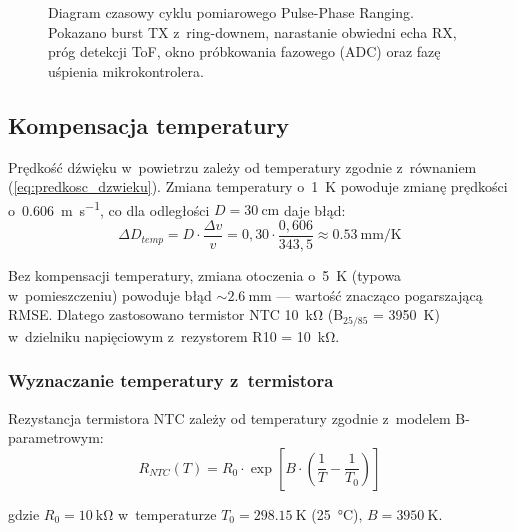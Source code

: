 \documentclass[a4paper,11pt]{article}
\begin{document}
\begin{figure}[H]
{%
    }
    \caption{Diagram czasowy cyklu pomiarowego Pulse-Phase Ranging. Pokazano burst
    TX z~ring-downem, narastanie obwiedni echa RX, próg detekcji ToF, okno
    próbkowania fazowego (ADC) oraz fazę uśpienia mikrokontrolera.}
    \label{fig:diagram_czasowy}
\end{figure}

\subsection{Kompensacja temperatury}
\label{sec:temp_komp}

Prędkość dźwięku w~powietrzu zależy od temperatury zgodnie z~równaniem
(\ref{eq:predkosc_dzwieku}). Zmiana temperatury o~\SI{1}{\kelvin} powoduje
zmianę prędkości o~\SI{0,606}{\metre\per\second}, co dla odległości
$D = \SI{30}{\centi\metre}$ daje błąd:
\begin{equation}
    \Delta D_{temp} = D \cdot \frac{\Delta v}{v} = 0{,}30 \cdot \frac{0{,}606}{343{,}5} \approx \SI{0,53}{\milli\metre\per\kelvin}
    \label{eq:blad_temp}
\end{equation}

Bez kompensacji temperatury, zmiana otoczenia o~\SI{5}{\kelvin} (typowa
w~pomieszczeniu) powoduje błąd ${\sim}\SI{2,6}{\milli\metre}$ --- wartość
znacząco pogarszającą RMSE. Dlatego zastosowano termistor NTC \SI{10}{\kilo\ohm}
(B$_{25/85}$ = \SI{3950}{\kelvin}) w~dzielniku napięciowym z~rezystorem
R10 = \SI{10}{\kilo\ohm}.

\subsubsection{Wyznaczanie temperatury z~termistora}

Rezystancja termistora NTC zależy od temperatury zgodnie z~modelem
B-parametrowym:
\begin{equation}
    R_{NTC}(T) = R_0 \cdot \exp\!\left[B \cdot \left(\frac{1}{T} - \frac{1}{T_0}\right)\right]
    \label{eq:ntc_model}
\end{equation}

gdzie $R_0 = \SI{10}{\kilo\ohm}$ w~temperaturze $T_0 = \SI{298,15}{\kelvin}$
(\SI{25}{\celsius}), $B = \SI{3950}{\kelvin}$.
\end{document}
